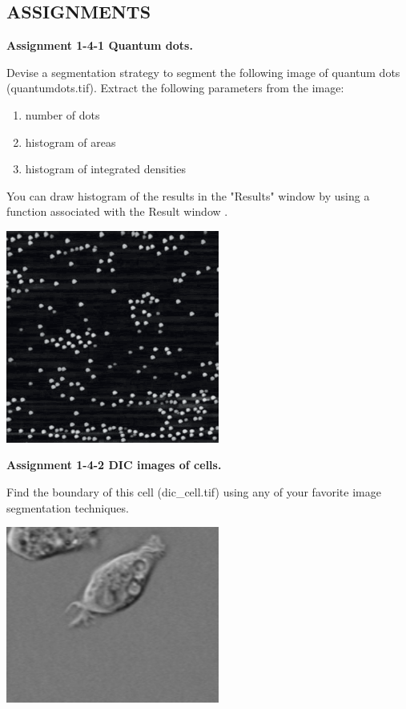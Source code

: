 \clearpage


\subsection{ASSIGNMENTS}

\textbf{\sffamily
Assignment 1-4-1 Quantum dots.}

Devise a segmentation strategy to segment
the following image of quantum dots (quantumdots.tif). Extract the
following parameters from the image: 
\begin{enumerate} 
\item number of dots
\item histogram of areas
\item histogram of integrated densities 
\end{enumerate}
You can draw histogram of the results in the "Results" window by using a
function associated with the Result window .\\

{\centering 
\includegraphics[width=7cm]{img/CMCIBasicCourse201102-img125.png}
\par}

\textbf{\sffamily
Assignment 1-4-2  DIC images of cells. }

Find the boundary of this cell (dic\_cell.tif) using any of your favorite image segmentation techniques.\\

{\centering 
\includegraphics[width=7cm]{img/CMCIBasicCourse201102-img126.png}
\par}

